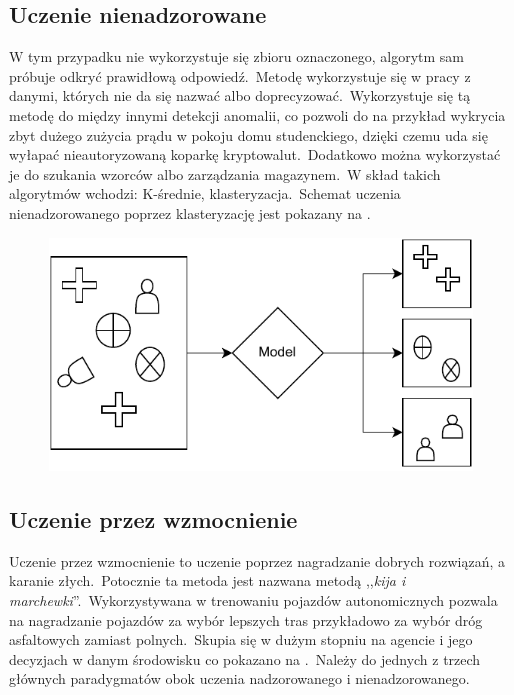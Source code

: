 \pagebreak

\subsection{Uczenie nienadzorowane}
W tym przypadku nie wykorzystuje się zbioru oznaczonego, algorytm sam próbuje odkryć prawidłową odpowiedź.\ Metodę wykorzystuje się w pracy z danymi, których nie da się nazwać albo doprecyzować.\ Wykorzystuje się tą metodę do między innymi detekcji anomalii, co pozwoli do na przykład wykrycia zbyt dużego zużycia prądu w pokoju domu studenckiego, dzięki czemu uda się wyłapać nieautoryzowaną koparkę kryptowalut.\ Dodatkowo można wykorzystać je do szukania wzorców albo zarządzania magazynem.\ W skład takich algorytmów wchodzi: K-średnie, klasteryzacja.\ Schemat uczenia nienadzorowanego poprzez klasteryzację jest pokazany na .

\begin{figure}[H]
    \centering
    \includegraphics[width=\textwidth]{images/unsupervised}
    \label{fig:unspervised}
\end{figure}

\pagebreak

\subsection{Uczenie przez wzmocnienie}
Uczenie przez wzmocnienie to uczenie poprzez nagradzanie dobrych rozwiązań, a karanie złych.\ Potocznie ta metoda jest nazwana metodą ,,\textit{kija i marchewki}''.\ Wykorzystywana w trenowaniu pojazdów autonomicznych pozwala na nagradzanie pojazdów za wybór lepszych tras przykładowo za wybór dróg asfaltowych zamiast polnych.\ Skupia się w dużym stopniu na agencie i jego decyzjach w danym środowisku co pokazano na .\ Należy do jednych z trzech głównych paradygmatów obok uczenia nadzorowanego i nienadzorowanego.

